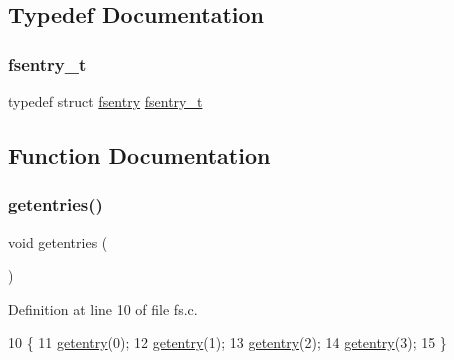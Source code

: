 \subsection{Typedef Documentation}
\mbox{\label{a00137_a9ccf6560e8aebea3e4402a31e8c0f46b_a9ccf6560e8aebea3e4402a31e8c0f46b}} 
\subsubsection{\texorpdfstring{fsentry\+\_\+t}{fsentry\_t}}
{\footnotesize\ttfamily typedef struct \hyperlink{a00242}{fsentry}  \hyperlink{a00137_a9ccf6560e8aebea3e4402a31e8c0f46b_a9ccf6560e8aebea3e4402a31e8c0f46b}{fsentry\+\_\+t}}



\subsection{Function Documentation}
\mbox{\label{a00137_a414110036132977c34813673360e1a63_a414110036132977c34813673360e1a63}} 
\subsubsection{\texorpdfstring{getentries()}{getentries()}}
{\footnotesize\ttfamily void getentries (\begin{DoxyParamCaption}{ }\end{DoxyParamCaption})}



Definition at line 10 of file fs.\+c.


\begin{DoxyCode}
10                   \{
11     \hyperlink{a00134_a3fb32d07d3bd05144a196c94fc59c0d1_a3fb32d07d3bd05144a196c94fc59c0d1}{getentry}(0);
12     \hyperlink{a00134_a3fb32d07d3bd05144a196c94fc59c0d1_a3fb32d07d3bd05144a196c94fc59c0d1}{getentry}(1);
13     \hyperlink{a00134_a3fb32d07d3bd05144a196c94fc59c0d1_a3fb32d07d3bd05144a196c94fc59c0d1}{getentry}(2);
14     \hyperlink{a00134_a3fb32d07d3bd05144a196c94fc59c0d1_a3fb32d07d3bd05144a196c94fc59c0d1}{getentry}(3);
15 \}
\end{DoxyCode}
\mbox{\label{a00137_a3fb32d07d3bd05144a196c94fc59c0d1_a3fb32d07d3bd05144a196c94fc59c0d1}} 
